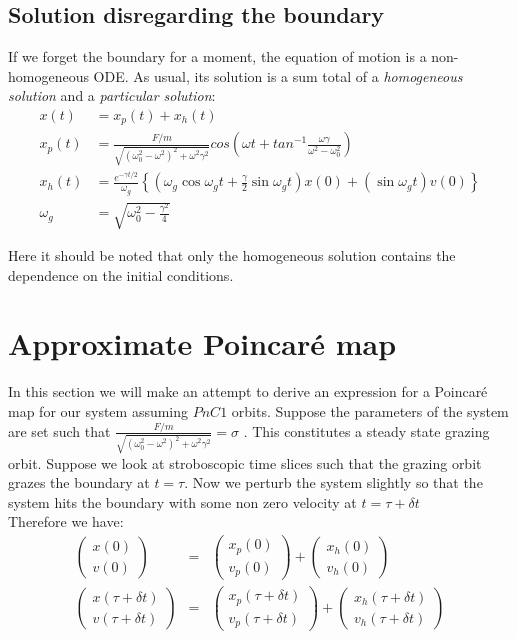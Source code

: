 \documentclass{book}
\renewcommand{\(}{\begin{columns}}
\renewcommand{\)}{\end{columns}}
\newcommand{\<}[1]{\begin{column}{#1}}
\renewcommand{\>}{\end{column}}
\newcommand{\colv}[2]{\begin{pmatrix}#1\\#2\end{pmatrix}}
\begin{document}
\subsection{Solution disregarding the boundary}
If we forget the boundary for a moment, the equation of motion is a non-homogeneous 
ODE.  As usual, its solution is a sum total of a \emph{homogeneous solution} 
and a \emph{particular solution}:
\begin{align}
\label{eq-shm-sol}
x(t)&=x_p(t)+x_h(t)\\
x_p(t)&=\frac{F/m}{\sqrt{(\omega_0^2-\omega^2)^2+\omega^2\gamma^2}}cos(\omega t+tan^{-1}\frac{\omega \gamma}{\omega^2-\omega_0^2})\\
x_h(t)&=\frac{e^{-\gamma t/2}}{\omega_g}\left\{(\omega_g\cos{\omega_gt}+\frac{\gamma}{2}\sin{\omega_gt})x(0) + (\sin{\omega_gt})v(0) \right\}\\
\omega_g&=\sqrt{\omega_0^2-\frac{\gamma^2}{4}}
\end{align}

Here it should be noted that only the homogeneous solution contains the 
dependence on the initial conditions.  

\section{Approximate Poincaré map}
In this section we will make an attempt to derive an expression for a Poincaré 
map for our system assuming $PnC1$ orbits.  
Suppose the parameters of the system are set such that 
$\frac{F/m}{\sqrt{(\omega_0^2-\omega^2)^2+\omega^2\gamma^2}}=\sigma$
. This constitutes a steady state grazing orbit. Suppose we look at stroboscopic time slices such that the grazing orbit grazes 
the boundary at $t=\tau$. Now we perturb the system slightly so that the system hits the boundary with 
some non zero velocity at $t=\tau+\delta t$\\

Therefore we have:
\begin{eqnarray*}
\colv{x(0)}{v(0)}&=&\colv{x_p(0)}{v_p(0)}+\colv{x_h(0)}{v_h(0)}\\
\colv{x(\tau+\delta t)}{v(\tau+\delta t)}&=&\colv{x_p(\tau+\delta t)}{v_p(\tau+\delta t)}+\colv{x_h(\tau+\delta t)}{v_h(\tau+\delta t)}
\end{eqnarray*}
 
\end{document}
